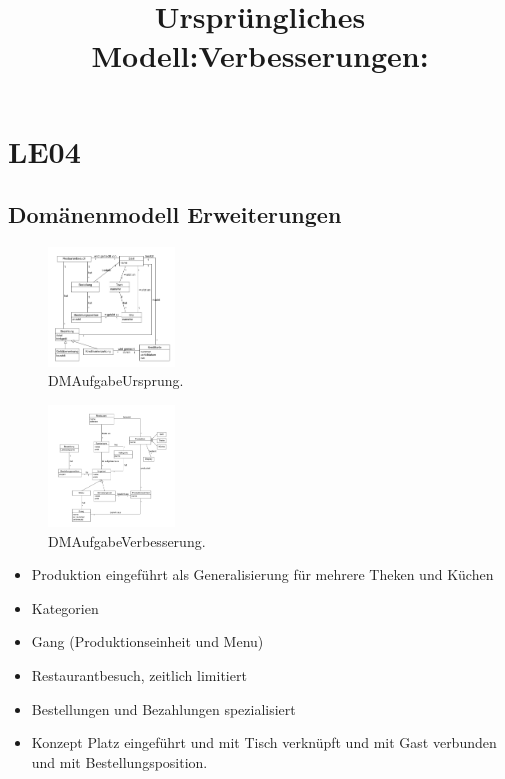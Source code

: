 \documentclass{article}
\begin{document}
\section{LE04}


\subsection{Domänenmodell Erweiterungen}

\title{Ursprüngliches Modell:}
\begin{figure}[H]
\centering
\includegraphics[width=0.3\textwidth]{Resources/Images/DMAufgabeUrsprung.png}
\caption{\label{fig:DMAufgabeUrsprung}DMAufgabeUrsprung.}
\end{figure}

\title{Verbesserungen: \\}
\begin{figure}[H]
\centering
\includegraphics[width=0.3\textwidth]{Resources/Images/DMAufgabeVerbesserung.png}
\caption{\label{fig:DMAufgabeVerbesserung}DMAufgabeVerbesserung.}
\end{figure}

\begin{itemize}
	\item Produktion eingeführt als Generalisierung für mehrere Theken und Küchen
	\item Kategorien
	\item Gang (Produktionseinheit und Menu)
	\item Restaurantbesuch, zeitlich limitiert
	\item Bestellungen und Bezahlungen spezialisiert
	\item Konzept Platz eingeführt und mit Tisch verknüpft und mit Gast verbunden und mit Bestellungsposition.
\end{itemize}
\end{document}
